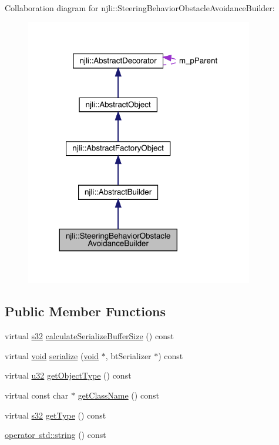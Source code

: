 Collaboration diagram for njli\+:\+:Steering\+Behavior\+Obstacle\+Avoidance\+Builder\+:\nopagebreak
\begin{figure}[H]
\begin{center}
\leavevmode
\includegraphics[width=282pt]{classnjli_1_1_steering_behavior_obstacle_avoidance_builder__coll__graph}
\end{center}
\end{figure}
\subsection*{Public Member Functions}
\begin{DoxyCompactItemize}
\item 
virtual \mbox{\hyperlink{_util_8h_aa62c75d314a0d1f37f79c4b73b2292e2}{s32}} \mbox{\hyperlink{classnjli_1_1_steering_behavior_obstacle_avoidance_builder_a893a6e8acffb0e70a142f7a339f77668}{calculate\+Serialize\+Buffer\+Size}} () const
\item 
virtual \mbox{\hyperlink{_thread_8h_af1e856da2e658414cb2456cb6f7ebc66}{void}} \mbox{\hyperlink{classnjli_1_1_steering_behavior_obstacle_avoidance_builder_a13ef8e5066f276bb2ef1d14cf85234f7}{serialize}} (\mbox{\hyperlink{_thread_8h_af1e856da2e658414cb2456cb6f7ebc66}{void}} $\ast$, bt\+Serializer $\ast$) const
\item 
virtual \mbox{\hyperlink{_util_8h_a10e94b422ef0c20dcdec20d31a1f5049}{u32}} \mbox{\hyperlink{classnjli_1_1_steering_behavior_obstacle_avoidance_builder_a8dc9e8fb3607fadbcda02aec50d0a94d}{get\+Object\+Type}} () const
\item 
virtual const char $\ast$ \mbox{\hyperlink{classnjli_1_1_steering_behavior_obstacle_avoidance_builder_a993b8b48be00564264eee0e58bd0bbd6}{get\+Class\+Name}} () const
\item 
virtual \mbox{\hyperlink{_util_8h_aa62c75d314a0d1f37f79c4b73b2292e2}{s32}} \mbox{\hyperlink{classnjli_1_1_steering_behavior_obstacle_avoidance_builder_a3ebfe2578e02d2d3384c4fe9a8da77dd}{get\+Type}} () const
\item 
\mbox{\hyperlink{classnjli_1_1_steering_behavior_obstacle_avoidance_builder_a3b201a2ae4dc678d0b9948ef4ce9abd5}{operator std\+::string}} () const
\end{DoxyCompactItemize}
